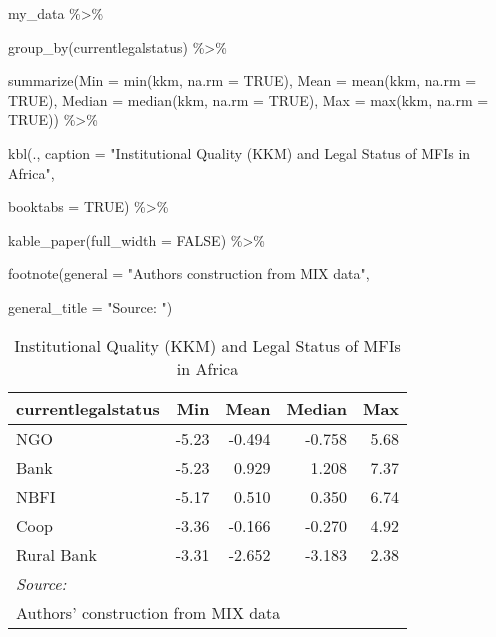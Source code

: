 \documentclass[a4paper,nobind]{templates/ociamthesis}
\newenvironment{Shaded}{\begin{snugshade}}{\end{snugshade}}
\newcommand{\AttributeTok}[1]{\textcolor[rgb]{0.77,0.63,0.00}{#1}}
\newcommand{\ConstantTok}[1]{\textcolor[rgb]{0.00,0.00,0.00}{#1}}
\newcommand{\FunctionTok}[1]{\textcolor[rgb]{0.00,0.00,0.00}{#1}}
\newcommand{\NormalTok}[1]{#1}
\newcommand{\SpecialCharTok}[1]{\textcolor[rgb]{0.00,0.00,0.00}{#1}}
\newcommand{\StringTok}[1]{\textcolor[rgb]{0.31,0.60,0.02}{#1}}
\renewenvironment{Shaded}
{
  \vspace{10pt}%
  \begin{snugshade}%
}{%
  \end{snugshade}%
  \vspace{8pt}%
}
\begin{document}
\begin{Shaded}
\begin{Highlighting}[]
\NormalTok{my\_data }\SpecialCharTok{\%\textgreater{}\%} 
  
  \FunctionTok{group\_by}\NormalTok{(currentlegalstatus) }\SpecialCharTok{\%\textgreater{}\%} 
  
  \FunctionTok{summarize}\NormalTok{(}\AttributeTok{Min =} \FunctionTok{min}\NormalTok{(kkm, }\AttributeTok{na.rm =} \ConstantTok{TRUE}\NormalTok{),}
            \AttributeTok{Mean =} \FunctionTok{mean}\NormalTok{(kkm, }\AttributeTok{na.rm =} \ConstantTok{TRUE}\NormalTok{),}
            \AttributeTok{Median =} \FunctionTok{median}\NormalTok{(kkm, }\AttributeTok{na.rm =} \ConstantTok{TRUE}\NormalTok{),}
            \AttributeTok{Max =} \FunctionTok{max}\NormalTok{(kkm, }\AttributeTok{na.rm =} \ConstantTok{TRUE}\NormalTok{)) }\SpecialCharTok{\%\textgreater{}\%} 
  
  \FunctionTok{kbl}\NormalTok{(., }\AttributeTok{caption =} \StringTok{"Institutional Quality (KKM) and Legal Status of MFIs in Africa"}\NormalTok{, }
      
      \AttributeTok{booktabs =} \ConstantTok{TRUE}\NormalTok{) }\SpecialCharTok{\%\textgreater{}\%} 
  
  \FunctionTok{kable\_paper}\NormalTok{(}\AttributeTok{full\_width =} \ConstantTok{FALSE}\NormalTok{) }\SpecialCharTok{\%\textgreater{}\%} 
  
  \FunctionTok{footnote}\NormalTok{(}\AttributeTok{general =} \StringTok{"Authors\textquotesingle{} construction from MIX data"}\NormalTok{,}
           
           \AttributeTok{general\_title =} \StringTok{"Source: "}\NormalTok{)}
\end{Highlighting}
\end{Shaded}

\begin{table}

\caption{\label{tab:unnamed-chunk-23}Institutional Quality (KKM) and Legal Status of MFIs in Africa}
\centering
\begin{tabular}[t]{lrrrr}
\toprule
currentlegalstatus & Min & Mean & Median & Max\\
\midrule
NGO & -5.23 & -0.494 & -0.758 & 5.68\\
Bank & -5.23 & 0.929 & 1.208 & 7.37\\
NBFI & -5.17 & 0.510 & 0.350 & 6.74\\
Coop & -3.36 & -0.166 & -0.270 & 4.92\\
Rural Bank & -3.31 & -2.652 & -3.183 & 2.38\\
\bottomrule
\multicolumn{5}{l}{\rule{0pt}{1em}\textit{Source: }}\\
\multicolumn{5}{l}{\rule{0pt}{1em}Authors' construction from MIX data}\\
\end{tabular}
\end{table}
\end{document}
